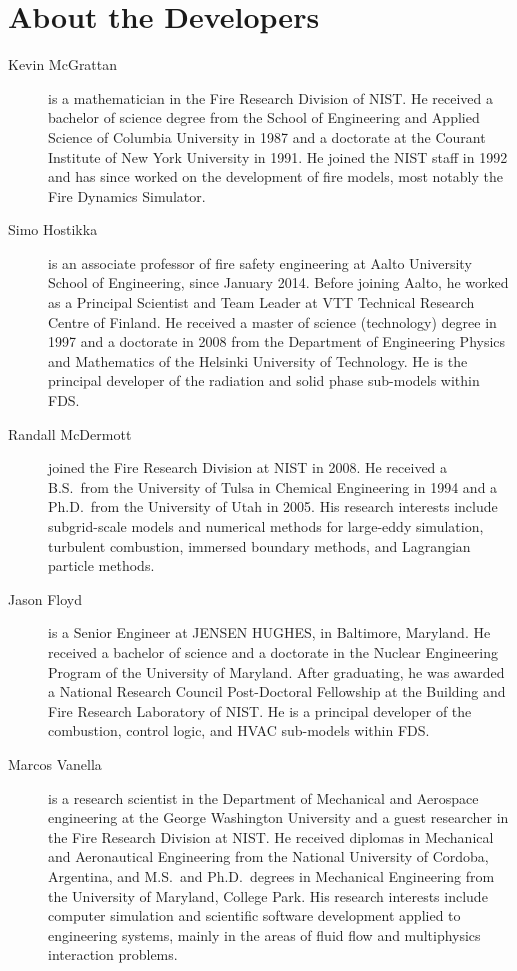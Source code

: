 \chapter{About the Developers}

\begin{description}

\item[Kevin McGrattan] is a mathematician in the Fire Research Division of NIST. He received a bachelor of science degree from the School of Engineering and Applied Science of Columbia University in 1987 and a doctorate at the Courant Institute of New York University in 1991. He joined the NIST staff in 1992 and has since worked on the development of fire models, most notably the Fire Dynamics Simulator.

\item[Simo Hostikka] is an associate professor of fire safety engineering at Aalto University School of Engineering, since January 2014. Before joining Aalto, he worked as a Principal Scientist and Team Leader at VTT Technical Research Centre of Finland. He received a master of science (technology) degree in 1997 and a doctorate in 2008 from the Department of Engineering Physics and Mathematics of the Helsinki University of Technology.  He is the principal developer of the radiation and solid phase sub-models within FDS.

\item[Randall McDermott] joined the Fire Research Division at NIST in 2008. He received a B.S.~from the University of Tulsa in Chemical Engineering in 1994 and a Ph.D.~from the University of Utah in 2005. His research interests include subgrid-scale models and numerical methods for large-eddy simulation, turbulent combustion, immersed boundary methods, and Lagrangian particle methods.

\item[Jason Floyd] is a Senior Engineer at JENSEN HUGHES, in Baltimore, Maryland. He received a bachelor of science and a doctorate in the Nuclear Engineering Program of the University of Maryland. After graduating, he was awarded a National Research Council Post-Doctoral Fellowship at the Building and Fire Research Laboratory of NIST. He is a principal developer of the combustion, control logic, and HVAC sub-models within FDS.

\item[Marcos Vanella] is a research scientist in the Department of Mechanical and Aerospace engineering at the George Washington University and a guest researcher in the Fire Research Division at NIST. He received diplomas in Mechanical and Aeronautical Engineering from the National University of Cordoba, Argentina, and M.S.~and Ph.D.~degrees in Mechanical Engineering from the University of Maryland, College Park. His research interests include computer simulation and scientific software development applied to engineering systems, mainly in the areas of fluid flow and multiphysics interaction problems.


\end{description}
